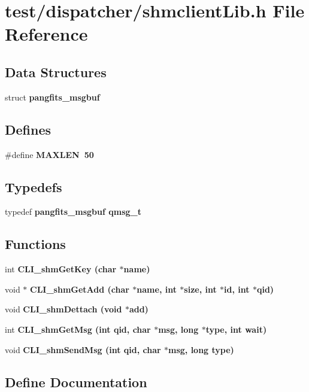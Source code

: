 \section{test/dispatcher/shmclient\-Lib.h File Reference}
\label{dispatcher_2shmclientLib_8h}
\subsection*{Data Structures}
\begin{CompactItemize}
\item 
struct \bf{pangfits\_\-msgbuf}
\end{CompactItemize}
\subsection*{Defines}
\begin{CompactItemize}
\item 
\#define \bf{MAXLEN}~50
\end{CompactItemize}
\subsection*{Typedefs}
\begin{CompactItemize}
\item 
typedef \bf{pangfits\_\-msgbuf} \bf{qmsg\_\-t}
\end{CompactItemize}
\subsection*{Functions}
\begin{CompactItemize}
\item 
int \bf{CLI\_\-shm\-Get\-Key} (char $\ast$name)
\item 
void $\ast$ \bf{CLI\_\-shm\-Get\-Add} (char $\ast$name, int $\ast$size, int $\ast$id, int $\ast$qid)
\item 
void \bf{CLI\_\-shm\-Dettach} (void $\ast$add)
\item 
int \bf{CLI\_\-shm\-Get\-Msg} (int qid, char $\ast$msg, long $\ast$type, int wait)
\item 
void \bf{CLI\_\-shm\-Send\-Msg} (int qid, char $\ast$msg, long type)
\end{CompactItemize}


\subsection{Define Documentation}
